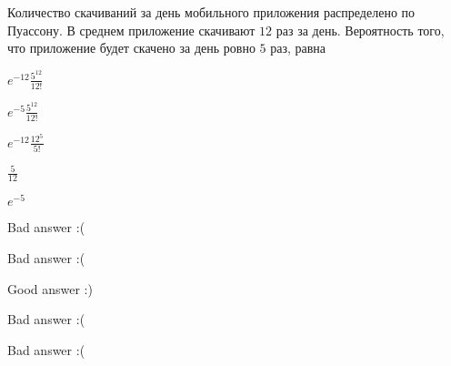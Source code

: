 
\begin{question}
Количество скачиваний за день мобильного приложения распределено по
Пуассону. В среднем приложение скачивают \(12\) раз за день. Вероятность
того, что приложение будет скачено за день ровно \(5\) раз, равна
\begin{answerlist}
  \item \(e^{-12}\frac{5^{12}}{12!}\)
  \item \(e^{-5}\frac{5^{12}}{12!}\)
  \item \({e}^{-12}\frac{12^5}{5!}\)
  \item \(\frac{5}{12}\)
  \item \(e^{-5}\)
\end{answerlist}
\end{question}

\begin{solution}
\begin{answerlist}
  \item Bad answer :(
  \item Bad answer :(
  \item Good answer :)
  \item Bad answer :(
  \item Bad answer :(
\end{answerlist}
\end{solution}


